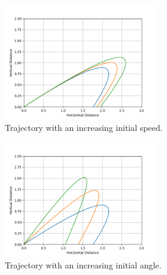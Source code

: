 \documentclass[12pt]{iopart} %
\begin{document}
\begin{figure}[h!tbp]
  \begin{center}
 \item[]\includegraphics[width=0.6\textwidth]{figure4.png}
  \caption{\label{fig:figure4}
  Trajectory with an increasing initial speed.
  }
  \end{center}
\end{figure}

\begin{figure}[h!tbp]
  \begin{center}
 \item[]\includegraphics[width=0.6\textwidth]{figure5.png}
  \caption{\label{fig:figure5}
  Trajectory with an increasing initial angle.
  }
  \end{center}
\end{figure}

\pagebreak

\begin{center}
\subtitle{\textbf{Firing Range}}
\end{center}
\end{document}
